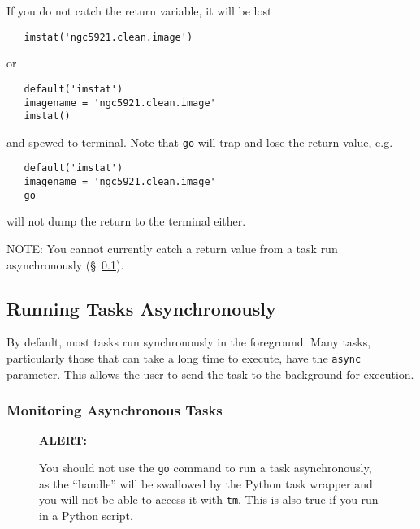 If you do not catch the return variable, it will be lost
\small
\begin{verbatim}
   imstat('ngc5921.clean.image')
\end{verbatim}
\normalsize
 or
\small
\begin{verbatim}
   default('imstat')
   imagename = 'ngc5921.clean.image'
   imstat()
\end{verbatim}
\normalsize
and spewed to terminal.  Note that {\tt go} will trap and lose
the return value, e.g.
\small
\begin{verbatim}
   default('imstat')
   imagename = 'ngc5921.clean.image'
   go
\end{verbatim}
\normalsize
will not dump the return to the terminal either.

NOTE: You cannot currently catch a return value from a task run
asynchronously (\S~\ref{section:intro.tasks.async}).

\subsection{Running Tasks Asynchronously}
\label{section:intro.tasks.async}

By default, most tasks run synchronously in the foreground.  Many
tasks, particularly those that can take a long time to execute,
have the {\tt async} parameter.  This allows the user to send the
task to the background for execution.

\subsubsection{Monitoring Asynchronous Tasks}
\label{section:intro.tasks.async.tm}


\begin{wrapfigure}{r}{2.5in}
  \begin{boxedminipage}{2.5in}
     \centerline{\bf ALERT:}
     You should not use the {\tt go} command to run a task
     asynchronously, as the ``handle'' will be swallowed by
     the Python task wrapper and you will not be able to
     access it with {\tt tm}.  This is also true if you run
     in a Python script.
  \end{boxedminipage}
\end{wrapfigure}

